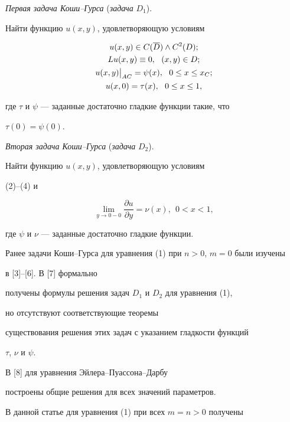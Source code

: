 {\it Первая задача Коши--Гурса} ({\it задача} $D_1$).


Найти функцию $u(x,y)$, удовлетворяющую условиям


\begin{gather}


u(x,y)\in C(\overline D)\land C^2(D);\\


Lu(x,y)\equiv 0, \ \ (x,y)\in D;\\


u(x,y)\big|_{AC}=\psi(x),\ \ 0\le x\le x_C ;\\


u(x,0)=\tau(x), \ \ 0\le x\le 1, \notag


\end{gather}


где $\tau$ и $\psi$ --- заданные достаточно гладкие функции такие, что


$\tau(0)=\psi(0)$.


\medskip





{\it Вторая задача Коши--Гурса} ({\it задача} $D_2$).


Найти функцию $u(x,y)$, удовлетворяющую условиям


(2)--(4) и


$$


\lim_{y\to 0-0} \frac{\partial u}{\partial y} = \nu(x), \ \ 0<x<1,


$$


где $\psi $ и $\nu$ --- заданные достаточно гладкие функции.


\medskip





Ранее задачи Коши--Гурса для уравнения (1) при $n>0$, $m=0$ были изучены 


в [3]--[6]. В [7] формально 


получены формулы решения задач $D_1$ и $D_2$ для уравнения (1), 


но отсутствуют соответствующие теоремы


существования решения этих задач с указанием гладкости функций 


$\tau$, $\nu$ и $\psi$. 


В [8] для уравнения Эйлера--Пуассона--Дарбу


построены общие решения для всех значений параметров.  


В данной статье для уравнения (1) при всех $m=n>0$ получены 


